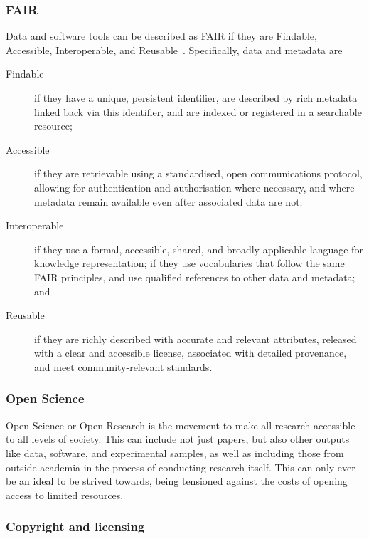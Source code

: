 \documentclass{article}
\begin{document}
\subsubsection{FAIR}

Data and software tools can be described as FAIR if they are
Findable, Accessible, Interoperable, and Reusable~\cite{wilkinson2016fair}.
Specifically,
data and metadata are
\begin{description}
  \item[Findable]
        if they have a unique, persistent identifier,
        are described by rich metadata linked back via this identifier,
        and are indexed or registered in a searchable resource;
  \item[Accessible]
        if they are retrievable using a standardised, open communications protocol,
        allowing for authentication and authorisation where necessary,
        and where metadata remain available even after associated data are not;
  \item[Interoperable]
        if they use a formal, accessible, shared, and broadly applicable language for knowledge representation;
        if they use vocabularies that follow the same FAIR principles,
        and use qualified references to other data and metadata;
        and
  \item[Reusable]
        if they are richly described with accurate and relevant attributes,
        released with a clear and accessible license,
        associated with detailed provenance,
        and meet community-relevant standards.
\end{description}

\subsubsection{Open Science}

Open Science or Open Research is
the movement to make all research accessible to all levels of society.
This can include not just papers,
but also other outputs like data, software, and experimental samples,
as well as including those from outside academia in
the process of conducting research itself.
This can only ever be an ideal to be strived towards,
being tensioned against the costs of opening access to limited resources.

\subsubsection{Copyright and licensing}
\end{document}
